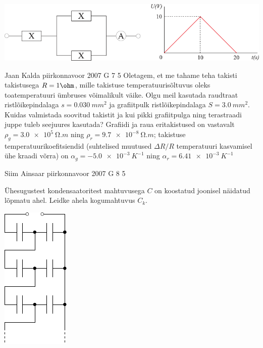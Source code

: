 \documentclass[11pt]{article}
\begin{document}
{{\begin{center}
	\includegraphics[width=\linewidth]{2009-lahg-03-yl}
\end{center}
\fi
}

{Jaan Kalda} %
{piirkonnavoor} %
{2007} %
{G 7} %
{5} %
{
\ifStatement
Oletagem, et me tahame teha takisti takistusega $R = 1 \ohm$, mille takistuse temperatuurisõltuvus oleks toatemperatuuri ümbruses võimalikult väike. Olgu meil kasutada raudtraat ristlõikepindalaga $s = \SI{0,030}{mm^2}$ ja grafiitpulk ristlõikepindalaga $S = \SI{3,0}{mm^2}$. Kuidas valmistada soovitud takistit ja kui pikki grafiitpulga ning terastraadi juppe tuleb seejuures kasutada? Grafiidi ja raua eritakistused on vastavalt $\rho_g = \SI{3,0e5}{\ohm.m}$ ning $\rho_r = \SI{9,7e-8}{\ohm.m}$; takistuse temperatuurikoefitsiendid (suhtelised muutused $\Delta R/R$ temperatuuri kasvamisel ühe kraadi võrra) on $\alpha_g = \SI{-5,0e-3}{K^{-1}}$ ning $\alpha_r = \SI{6,41e-3}{K^{-1}}$
\fi
}

{Siim Ainsaar} %
{piirkonnavoor} %
{2007} %
{G 8} %
{5} %
{
\ifStatement
Ühesugustest kondensaatoritest mahtuvusega $C$ on koostatud joonisel näidatud lõpmatu ahel. Leidke ahela kogumahtuvus $C_k$.

\begin{center}
	\includegraphics[width=0.3\linewidth]{2007-v2g-08-yl}
\end{center}
\fi
}

}
\end{document}
